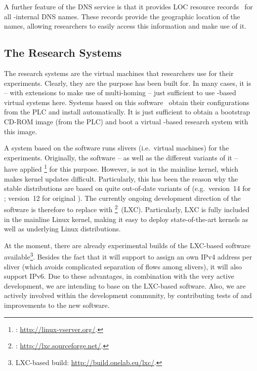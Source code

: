 A further feature of the  DNS service is that it provides LOC resource records~\cite{RFC1876} for all  -internal DNS names. These records provide the geographic location of the names, allowing researchers to easily access this information and make use of it.


\subsection{The Research Systems}
\label{sub:The-Research-Systems}

The research systems are the virtual machines that researchers use for their experiments. Clearly, they are the purpose  has been built for. In many cases, it is -- with extensions to make use of multi-homing -- just sufficient to use -based virtual systems here. Systems based on this software~\cite{PBF+05} obtain their configurations from the PLC and install automatically. It is just sufficient to obtain a bootstrap CD-ROM image (from the PLC) and boot a virtual -based research system with this image.

A system based on the  software runs slivers (i.e.\ virtual machines) for the experiments. Originally, the  software -- as well as the different variants of it -- have applied \footnote{: \url{http://linux-vserver.org/}.} for this purpose. However,  is not in the mainline kernel, which makes kernel updates difficult. Particularly, this has been the reason why the stable  distributions are based on quite out-of-date variants of  (e.g.\ version~14 for ; version~12 for original ). The currently ongoing development direction of the  software is therefore to replace  with \footnote{: \url{http://lxc.sourceforge.net/}.}~(LXC). Particularly, LXC is fully included in the mainline Linux kernel, making it easy to deploy state-of-the-art kernels as well as underlying Linux distributions.

At the moment, there are already experimental builds of the LXC-based  software available\footnote{LXC-based  build: \url{http://build.onelab.eu/lxc/}.}. Besides the fact that it will support to assign an own IPv4 address per sliver (which avoids complicated separation of flows among slivers), it will also support IPv6. Due to these advantages, in combination with the very active development, we are intending to base  on the LXC-based software. Also, we are actively involved within the development community, by contributing tests of and improvements to the new software.

